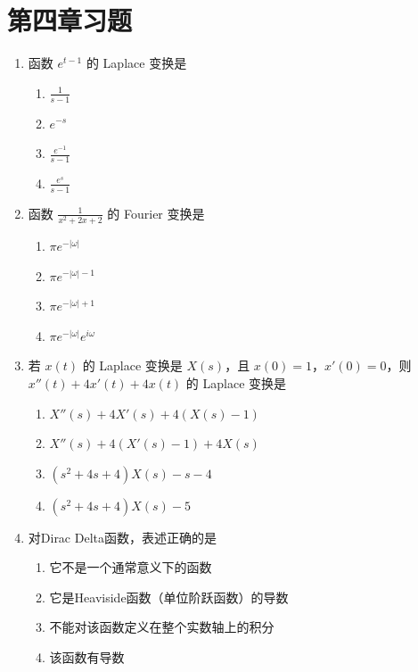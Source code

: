 \documentclass[openany,oneside]{ctexbook}
\begin{document}
\section{第四章习题}
\begin{enumerate}[label=\arabic*., start=1]

\item 函数 \( e^{t-1} \) 的 Laplace 变换是
\begin{enumerate}[label=\Alph*.]
\item \(\displaystyle \frac{1}{s-1}\)
\item \(\displaystyle e^{-s}\)
\item \(\displaystyle \frac{e^{-1}}{s-1}\)
\item \(\displaystyle \frac{e^s}{s-1}\)
\end{enumerate}

\item 函数 \(\frac{1}{x^2 + 2x + 2}\) 的 Fourier 变换是
\begin{enumerate}[label=\Alph*.]
\item \(\pi e^{-|\omega|}\)
\item \(\pi e^{-|\omega|-1}\)
\item \(\pi e^{-|\omega|+1}\)
\item \(\pi e^{-|\omega|}e^{i\omega}\)
\end{enumerate}

\item 若 \(x(t)\) 的 Laplace 变换是 \(X(s)\)，且 \(x(0)=1\)，\(x'(0)=0\)，则 \(x''(t)+4x'(t)+4x(t)\) 的 Laplace 变换是
\begin{enumerate}[label=\Alph*.]
\item \(X''(s)+4X'(s)+4(X(s)-1)\)
\item \(X''(s)+4(X'(s)-1)+4X(s)\)
\item \((s^2+4s+4)X(s)-s-4\)
\item \((s^2+4s+4)X(s)-5\)
\end{enumerate}

\item 对Dirac Delta函数，表述正确的是
\begin{enumerate}[label=\Alph*.]
\item 它不是一个通常意义下的函数
\item 它是Heaviside函数（单位阶跃函数）的导数
\item 不能对该函数定义在整个实数轴上的积分
\item 该函数有导数
\end{enumerate}


\end{enumerate}
\end{document}
